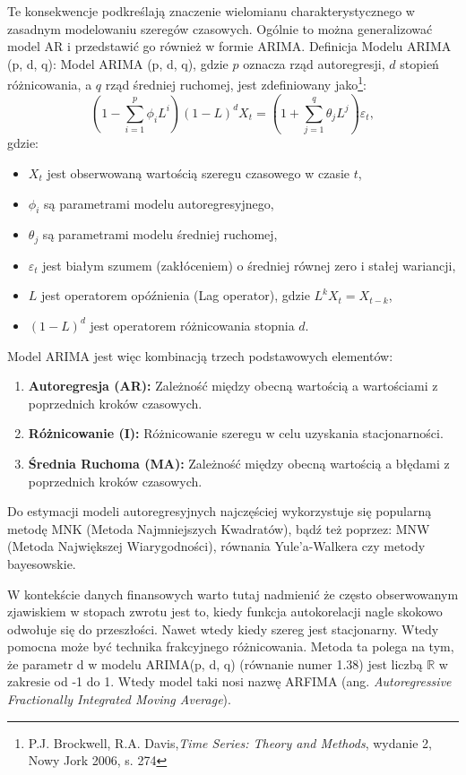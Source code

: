 \begin{enumerate}
Te konsekwencje podkreślają znaczenie wielomianu charakterystycznego w zasadnym modelowaniu szeregów czasowych. Ogólnie to można generalizować model AR i przedstawić go również w formie ARIMA. Definicja Modelu ARIMA (p, d, q):
Model ARIMA (p, d, q), gdzie \( p \) oznacza rząd autoregresji, \( d \) stopień różnicowania, a \( q \) rząd średniej ruchomej, jest zdefiniowany jako\footnote{P.J. Brockwell, R.A. Davis,\textit{Time Series: Theory and Methods}, wydanie 2, Nowy Jork 2006, s. 274}:
\begin{equation}
(1 - \sum_{i=1}^{p} \phi_i L^i) (1 - L)^d X_t = (1 + \sum_{j=1}^{q} \theta_j L^j) \varepsilon_t,
\end{equation}
gdzie:
\begin{itemize}
    \item \( X_t \) jest obserwowaną wartością szeregu czasowego w czasie \( t \),
    \item \( \phi_i \) są parametrami modelu autoregresyjnego,
    \item \( \theta_j \) są parametrami modelu średniej ruchomej,
    \item \( \varepsilon_t \) jest białym szumem (zakłóceniem) o średniej równej zero i stałej wariancji,
    \item \( L \) jest operatorem opóźnienia (Lag operator), gdzie \( L^k X_t = X_{t-k} \),
    \item \( (1 - L)^d \) jest operatorem różnicowania stopnia \( d \).
\end{itemize}

Model ARIMA jest więc kombinacją trzech podstawowych elementów:
\begin{enumerate}
    \item \textbf{Autoregresja (AR):} Zależność między obecną wartością a wartościami z poprzednich kroków czasowych.
    \item \textbf{Różnicowanie (I):} Różnicowanie szeregu w celu uzyskania stacjonarności.
    \item \textbf{Średnia Ruchoma (MA):} Zależność między obecną wartością a błędami z poprzednich kroków czasowych.
\end{enumerate}
Do estymacji modeli autoregresyjnych najczęściej wykorzystuje się popularną metodę MNK (Metoda Najmniejszych Kwadratów), bądź też poprzez: MNW (Metoda Największej Wiarygodności), równania Yule'a-Walkera czy metody bayesowskie.

W kontekście danych finansowych warto tutaj nadmienić że często obserwowanym zjawiskiem w stopach zwrotu jest to, kiedy funkcja autokorelacji nagle skokowo odwołuje się do przeszłości. Nawet wtedy kiedy szereg jest stacjonarny. Wtedy pomocna może być technika frakcyjnego różnicowania. Metoda ta polega na tym, że parametr d w modelu ARIMA(p, d, q) (równanie numer 1.38) jest liczbą \(\mathbb{R} \)  w zakresie od -1 do 1. Wtedy model taki nosi nazwę ARFIMA (ang. \textit{Autoregressive Fractionally Integrated Moving Average}).


\end{enumerate}
